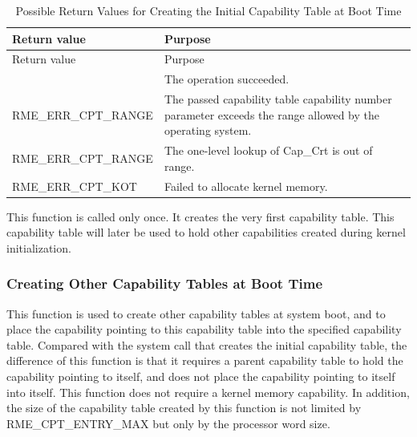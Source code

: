 \begin{xltabular}{\textwidth}{@{}>{\hsize\raggedright\arraybackslash}X>{\hsize\raggedright\arraybackslash}X@{}}
\caption{Possible Return Values for Creating the Initial Capability Table at Boot Time}\label{tab:7-42-create-initial-capability-table-at-boot-return-values}\\
\toprule
Return value & Purpose\tabularnewline
\endfirsthead
\toprule
Return value & Purpose\tabularnewline
\midrule
\endhead
\bottomrule
{} & The operation succeeded.\tabularnewline
    RME\_ERR\_CPT\_RANGE & The passed capability table capability number parameter exceeds the range allowed by the operating system.\tabularnewline
    RME\_ERR\_CPT\_RANGE & The one-level lookup of Cap\_Crt is out of range.\tabularnewline
    RME\_ERR\_CPT\_KOT & Failed to allocate kernel memory.\tabularnewline
\end{xltabular}
\nopagebreak[4]

This function is called only once. It creates the very first capability table. This capability table will later be used to hold other capabilities created during kernel initialization.

\subsubsection{Creating Other Capability Tables at Boot Time}\label{subsubsec:7-create-other-capability-tables-at-boot}

This function is used to create other capability tables at system boot, and to place the capability pointing to this capability table into the specified capability table. Compared with the system call that creates the initial capability table, the difference of this function is that it requires a parent capability table to hold the capability pointing to itself, and does not place the capability pointing to itself into itself. This function does not require a kernel memory capability. In addition, the size of the capability table created by this function is not limited by RME\_CPT\_ENTRY\_MAX but only by the processor word size.

